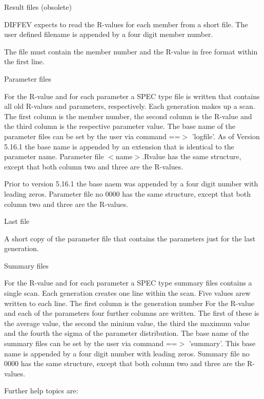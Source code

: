 Result files (obsolete) 
\par
DIFFEV expects to read the R-values for each member from a short file. 
The user defined filename is appended by a four digit member number. 
\par
The file must contain the member number and the R-value in free format 
within the first line. 
\par
Parameter files 
\par
For the R-value and for each parameter a SPEC type file is written that 
contains all old R-values and parameters, respectively. 
Each generation makes up a scan. The first column is the member number, 
the second column is the R-value and the third column is the respective 
parameter value. 
The base name of the parameter files can be set by the user via command 
==$> $ 'logfile'. As of Version 5.16.1 the base name is appended by an 
extension that is identical to the parameter name. Parameter file 
$ <$name$> $.Rvalue has the same structure, except that both column two and 
three are the R-values. 
\par
Prior to version 5.16.1 the base naem was appended by a four digit 
number with leading zeros. Parameter file no 0000 has the same 
structure, except that both column two and three are the R-values. 
\par
Last file 
\par
A short copy of the parameter file that contains the parameters 
just for the last generation. 
\par
Summary files 
\par
For the R-value and for each parameter a SPEC type summary files 
contains a single scan. Each generation creates one line within the 
scan. Five values arew written to each line. The first column is the 
generation number 
For the R-value and each of the parameters four further columns are 
written. The first of these is the average value, the second the 
minium value, the third the maximum value and the fourth the sigma of 
the parameter distribution. 
The base name of the summary files can be set by the user via command 
==$> $ 'summary'. This base name is appended by a four digit number with 
leading zeros. Summary file no 0000 has the same structure, except that 
both column two and three are the R-values. 
\par
Further help topics are: 
\par

